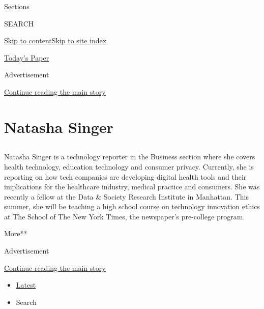 Sections

SEARCH

\protect\hyperlink{site-content}{Skip to
content}\protect\hyperlink{site-index}{Skip to site index}

\href{https://myaccount.nytimes3xbfgragh.onion/auth/login?response_type=cookie\&client_id=vi}{}

\href{https://www.nytimes3xbfgragh.onion/section/todayspaper}{Today's
Paper}

Advertisement

\protect\hyperlink{after-top}{Continue reading the main story}

\hypertarget{natasha-singer}{%
\section{Natasha Singer}\label{natasha-singer}}

\subsection{}

Natasha Singer is a technology reporter in the Business section where
she covers health technology, education technology and consumer privacy.
Currently, she is reporting on how tech companies are developing digital
health tools and their implications for the healthcare industry, medical
practice and consumers. She was recently a fellow at the Data \& Society
Research Institute in Manhattan. This summer, she will be teaching a
high school course on technology innovation ethics at The School of The
New York Times, the newspaper's pre-college program.

More**

Advertisement

\protect\hyperlink{after-mid1}{Continue reading the main story}

\begin{itemize}
\tightlist
\item
  \protect\hyperlink{stream-panel}{Latest}
\item
  Search
\end{itemize}

